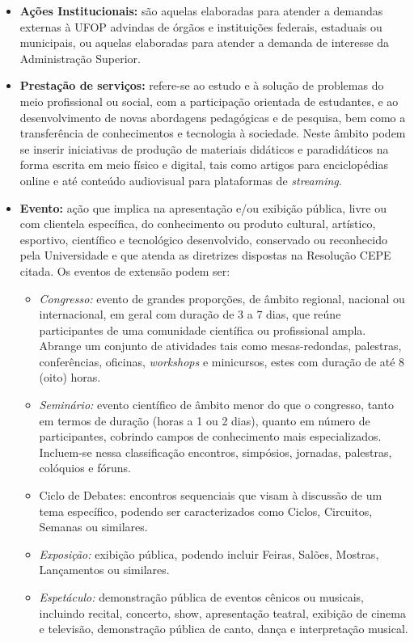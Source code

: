 \documentclass[
	12pt,				%
	openright,			%
	oneside,			%
	a4paper,			%
	english,			%
	brazil				%
	]{abntex2}
\begin{document}
\begin{itemize}
\item \textbf{Ações Institucionais:} são aquelas elaboradas para atender a demandas externas à UFOP advindas de órgãos e instituições federais, estaduais ou municipais, ou aquelas elaboradas para atender a demanda de interesse da Administração Superior.
\item \textbf{Prestação de serviços:} refere-se ao estudo e à solução de problemas do meio profissional ou social, com a participação orientada de estudantes, e ao desenvolvimento de novas abordagens pedagógicas e de pesquisa, bem como a transferência de conhecimentos e tecnologia à sociedade. Neste âmbito podem se inserir iniciativas de produção de materiais didáticos e paradidáticos na forma escrita em meio físico e digital, tais como artigos para enciclopédias online e até conteúdo audiovisual para plataformas de \textit{streaming}.
\item \textbf{Evento:} ação que implica na apresentação e/ou exibição pública, livre ou com clientela específica, do conhecimento ou produto cultural, artístico, esportivo, científico e tecnológico desenvolvido, conservado ou reconhecido pela Universidade e que atenda as diretrizes dispostas na Resolução CEPE citada. Os eventos de extensão podem ser:
\begin{itemize}
    \item \textit{Congresso:} evento de grandes proporções, de âmbito regional, nacional ou internacional, em geral com duração de 3 a 7 dias, que reúne participantes de uma comunidade científica ou profissional ampla. Abrange um conjunto de atividades tais como mesas-redondas, palestras, conferências, oficinas, \textit{workshops} e minicursos, estes com duração de até 8 (oito) horas.
    \item \textit{Seminário:} evento científico de âmbito menor do que o congresso, tanto em termos de duração (horas a 1 ou 2 dias), quanto em número de participantes, cobrindo campos de conhecimento mais especializados. Incluem-se nessa classificação encontros, simpósios, jornadas, palestras, colóquios e fóruns.
    \item{Ciclo de Debates:} encontros sequenciais que visam à discussão de um tema específico, podendo ser caracterizados como Ciclos, Circuitos, Semanas ou similares.
    \item \textit{Exposição:} exibição pública, podendo incluir Feiras, Salões, Mostras, Lançamentos ou similares.
    \item \textit{Espetáculo:} demonstração pública de eventos cênicos ou musicais, incluindo recital, concerto, show, apresentação teatral, exibição de cinema e televisão, demonstração pública de canto, dança e interpretação musical.

\end{itemize}
\end{itemize}
\end{document}
